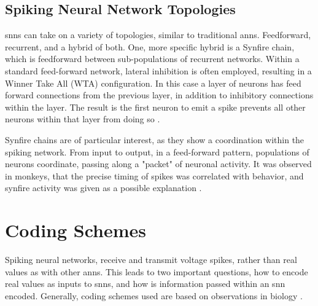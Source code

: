     
    \subsection{Spiking Neural Network Topologies}
    \glspl{snn} can take on a variety of topologies, similar to traditional
    \glspl{ann}. Feedforward, recurrent, and a hybrid of both. One, more specific
    hybrid is a Synfire chain, which is feedforward between sub-populations of
    recurrent networks. Within a standard feed-forward network, lateral
    inhibition is often employed, resulting in a Winner Take All (WTA)
    configuration. In this case a layer of neurons has feed forward connections
    from the previous layer, in addition to inhibitory connections within the
    layer. The result is the first neuron to emit a spike prevents all other
    neurons within that layer from doing so \parencite{ponulak_2011}.
    
    Synfire chains are of particular interest, as they show a coordination
    within the spiking network. From input to output, in a feed-forward pattern,
    populations of neurons coordinate, passing along a "packet" of neuronal
    activity. It was observed in monkeys, that the precise timing of spikes was
    correlated with behavior, and synfire activity was given as a possible
    explanation \parencite{aertsen_1996}.
    
    \section{Coding Schemes}
    Spiking neural networks, receive and transmit voltage spikes, rather than
    real values as with other \glspl{ann}. This leads to two important
    questions, how to encode real values as inputs to \glspl{snn}, and how is
    information passed within an \gls{snn} encoded. Generally, coding schemes
    used are based on observations in biology \parencite{ponulak_2011}.
    
